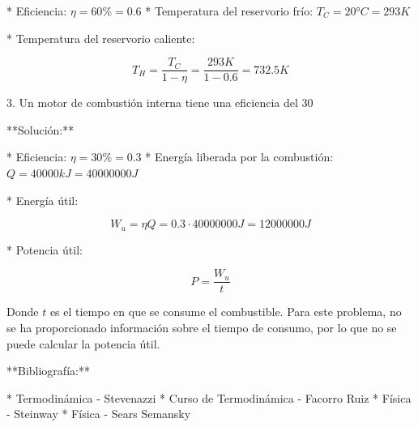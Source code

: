 \documentclass[../main]{subfiles}
\begin{document}
* Eficiencia: $\eta = 60\% = 0.6$
* Temperatura del reservorio frío: $T_C = 20 °C = 293 K$

* Temperatura del reservorio caliente:

$$
T_H = \frac{T_C}{1 - \eta} = \frac{293 K}{1 - 0.6} = 732.5 K
$$

3. Un motor de combustión interna tiene una eficiencia del 30%

**Solución:**

* Eficiencia: $\eta = 30\% = 0.3$
* Energía liberada por la combustión: $Q = 40 000 kJ = 40 000 000 J$

* Energía útil:

$$
W_u = \eta Q = 0.3 \cdot 40 000 000 J = 12 000 000 J
$$

* Potencia útil:

$$
P = \frac{W_u}{t}
$$

Donde $t$ es el tiempo en que se consume el combustible. Para este problema, no se ha proporcionado información sobre el tiempo de consumo, por lo que no se puede calcular la potencia útil.

**Bibliografía:**

* Termodinámica - Stevenazzi
* Curso de Termodinámica - Facorro Ruiz
* Física - Steinway
* Física - Sears Semansky
\end{document}
